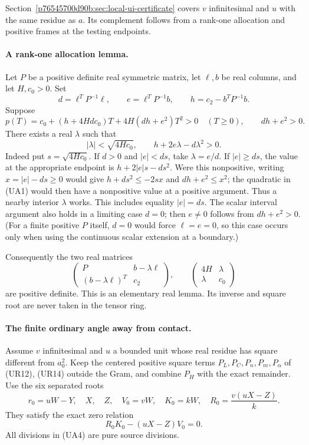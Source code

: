 Section~\ref{p76545700d90b:sec:local-ui-certificate} covers $v$ infinitesimal
and $u$ with the same residue as $a$. Its complement follows from a
rank-one allocation and positive frames at the testing endpoints.

\paragraph{A rank-one allocation lemma.}
Let $P$ be a positive definite real symmetric matrix, let $\ell,b$ be
real columns, and let $H,c_0>0$. Set
\[
 d=\ell^TP^{-1}\ell,\qquad e=\ell^TP^{-1}b,\qquad
 h=c_2-b^TP^{-1}b.
\]
Suppose
\[
 p(T)=c_0+(h+4Hdc_0)T+4H(dh+e^2)T^2>0\quad(T\ge0),
 \qquad dh+e^2>0.                                      \tag{UA1}
\]
There exists a real $\lambda$ such that
\[
 |\lambda|<\sqrt{4Hc_0},\qquad
 h+2e\lambda-d\lambda^2>0.                             \tag{UA2}
\]
Indeed put $s=\sqrt{4Hc_0}$. If $d>0$ and $|e|<ds$, take
$\lambda=e/d$. If $|e|\ge ds$, the value at the appropriate endpoint
is $h+2|e|s-ds^2$. Were this nonpositive, writing
$x=|e|-ds\ge0$ would give
$h+ds^2\le-2sx$ and $dh+e^2\le x^2$; the quadratic in (UA1)
would then have a nonpositive value at a positive argument. Thus a
nearby interior $\lambda$ works. This includes equality $|e|=ds$.
The scalar interval argument also holds in a limiting case $d=0$;
then $e\ne0$ follows from $dh+e^2>0$. (For a finite positive $P$
itself, $d=0$ would force $\ell=e=0$, so this case occurs only
when using the continuous scalar extension at a boundary.)

Consequently the two real matrices
\[
 \begin{pmatrix}P&b-\lambda\ell\\(b-\lambda\ell)^T&c_2\end{pmatrix},
 \qquad
 \begin{pmatrix}4H&\lambda\\\lambda&c_0\end{pmatrix}       \tag{UA3}
\]
are positive definite. This is an elementary real lemma. Its inverse
and square root are never taken in the tensor ring.

\paragraph{The finite ordinary angle away from contact.}
Assume $v$ infinitesimal and $u$ a bounded unit whose real residue has
square different from $a_0^2$. Keep the centered positive square terms
$P_L,P_C,P_n,P_m,P_\alpha$ of (UR12), (UR14) outside the Gram, and
combine $P_H$ with the exact remainder. Use the six separated roots
\[
 r_0=uW-Y,\quad X,\quad Z,\quad V_0=vW,\quad K_0=kW,
 \quad R_0=\frac{v(uX-Z)}{k}.                           \tag{UA4}
\]
They satisfy the exact zero relation
\[
 R_0K_0-(uX-Z)V_0=0.                                  \tag{UA5}
\]
All divisions in (UA4) are pure source divisions.

